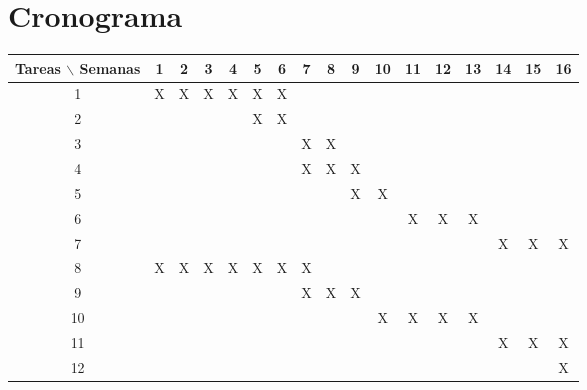 \documentclass[preprint]{aastex62}
\begin{document}
  \section{Cronograma}

  \begin{table}[htb]
    \begin{tabular}{|c|cccccccccccccccc| }
      \hline
      Tareas $\backslash$ Semanas & 1 & 2 & 3 & 4 & 5 & 6 & 7 & 8 & 9 & 10 & 11 & 12 & 13 & 14 & 15 & 16  \\
      \hline
      1 & X & X & X & X & X & X &   &   &   &   &   &   &   &   &   &   \\
      2 &   &   &   &   & X & X &   &   &   &   &   &   &   &   &   &   \\
      3 &   &   &   &   &   &   & X & X &   &   &   &   &   &   &   &   \\
      4 &   &   &   &   &   &   & X & X & X &   &   &   &   &   &   &   \\
      5 &   &   &   &   &   &   &   &   & X & X &   &   &   &   &   &   \\
      6 &   &   &   &   &   &   &   &   &   &   & X & X & X &   &   &   \\
      7 &   &   &   &   &   &   &   &   &   &   &   &   &   & X & X & X \\
      8 & X & X & X & X & X & X & X &   &   &   &   &   &   &   &   &   \\
      9 &   &   &   &   &   &   & X & X & X &   &   &   &   &   &   &   \\
      10&   &   &   &   &   &   &   &   &   & X & X & X & X &   &   &   \\
      11&   &   &   &   &   &   &   &   &   &   &   &   &   & X & X & X \\
      12&   &   &   &   &   &   &   &   &   &   &   &   &   &   &   & X \\
      \hline
    \end{tabular}
  \end{table}
\end{document}
